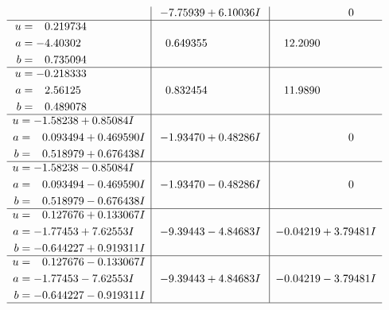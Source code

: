 \documentclass[1p]{elsarticle_modified}
\theoremstyle{definition}
\begin{document}
$$\begin{array}{c|c|c}
 & -7.75939 + 6.10036 I & \phantom{-0.000000 } 0 \\ \hline\begin{aligned}
u &= \phantom{-}0.219734\phantom{ +0.000000I} \\
a &= -4.40302\phantom{ +0.000000I} \\
b &= \phantom{-}0.735094\phantom{ +0.000000I}\end{aligned}
 & \phantom{-}0.649355\phantom{ +0.000000I} & \phantom{-}12.2090\phantom{ +0.000000I} \\ \hline\begin{aligned}
u &= -0.218333\phantom{ +0.000000I} \\
a &= \phantom{-}2.56125\phantom{ +0.000000I} \\
b &= \phantom{-}0.489078\phantom{ +0.000000I}\end{aligned}
 & \phantom{-}0.832454\phantom{ +0.000000I} & \phantom{-}11.9890\phantom{ +0.000000I} \\ \hline\begin{aligned}
u &= -1.58238 + 0.85084 I \\
a &= \phantom{-}0.093494 + 0.469590 I \\
b &= \phantom{-}0.518979 + 0.676438 I\end{aligned}
 & -1.93470 + 0.48286 I & \phantom{-0.000000 } 0 \\ \hline\begin{aligned}
u &= -1.58238 - 0.85084 I \\
a &= \phantom{-}0.093494 - 0.469590 I \\
b &= \phantom{-}0.518979 - 0.676438 I\end{aligned}
 & -1.93470 - 0.48286 I & \phantom{-0.000000 } 0 \\ \hline\begin{aligned}
u &= \phantom{-}0.127676 + 0.133067 I \\
a &= -1.77453 + 7.62553 I \\
b &= -0.644227 + 0.919311 I\end{aligned}
 & -9.39443 - 4.84683 I & -0.04219 + 3.79481 I \\ \hline\begin{aligned}
u &= \phantom{-}0.127676 - 0.133067 I \\
a &= -1.77453 - 7.62553 I \\
b &= -0.644227 - 0.919311 I\end{aligned}
 & -9.39443 + 4.84683 I & -0.04219 - 3.79481 I\\
 \hline 
 \end{array}$$\newpage$$\begin{array}{c|c|c}  

\end{array}$$
\end{document}

